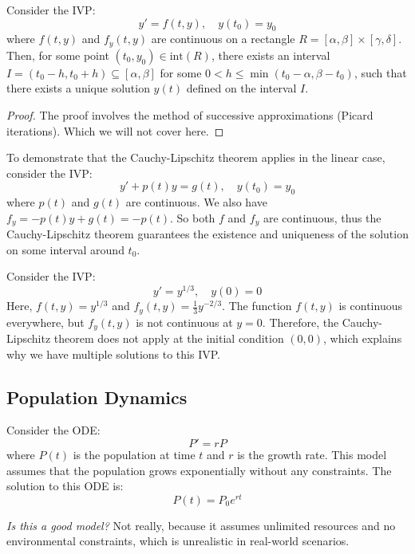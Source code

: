 \documentclass[11pt]{article}
\begin{document}
\begin{theorem}
    Consider the IVP:
    $$
    y' = f(t, y), \quad y(t_0) = y_0
    $$
    where \( f(t, y) \) and \( f_y(t, y) \) are continuous on a rectangle \( R = [\alpha, \beta] \times [\gamma, \delta] \). Then, for some point \((t_0, y_0) \in \mathrm{int}(R)\), there exists an interval \( I = (t_0 - h, t_0 + h) \subseteq [\alpha, \beta] \) for some \( 0 < h \le \min(t_0 - \alpha, \beta - t_0) \), such that there exists a unique solution \( y(t) \) defined on the interval \( I \).

\end{theorem}

\begin{proof}
    The proof involves the method of successive approximations (Picard iterations). Which we will not cover here.
\end{proof}

\begin{example}
    To demonstrate that the Cauchy-Lipschitz theorem applies in the linear case, consider the IVP:
    $$
    y' + p(t)y = g(t), \quad y(t_0) = y_0
    $$
    where \( p(t) \) and \( g(t) \) are continuous. We also have \( f_y = -p(t)y + g(t) = -p(t) \). So both \( f \) and \( f_y \) are continuous, thus the Cauchy-Lipschitz theorem guarantees the existence and uniqueness of the solution on some interval around \( t_0 \).
\end{example}

\begin{example}
    Consider the IVP:
    $$
    y' = y^{1/3}, \quad y(0) = 0
    $$
    Here, \( f(t, y) = y^{1/3} \) and \( f_y(t, y) = \frac{1}{3}y^{-2/3} \). The function \( f(t, y) \) is continuous everywhere, but \( f_y(t, y) \) is not continuous at \( y = 0 \). Therefore, the Cauchy-Lipschitz theorem does not apply at the initial condition \( (0, 0) \), which explains why we have multiple solutions to this IVP.
\end{example}

\subsection{Population Dynamics}
\begin{example}
    Consider the ODE:
    $$
    P' = rP
    $$
    where \( P(t) \) is the population at time \( t \) and \( r \) is the growth rate. This model assumes that the population grows exponentially without any constraints. The solution to this ODE is:
    $$
    P(t) = P_0 e^{rt}
    $$

    \textit{Is this a good model?} Not really, because it assumes unlimited resources and no environmental constraints, which is unrealistic in real-world scenarios.
\end{example}
\end{document}
